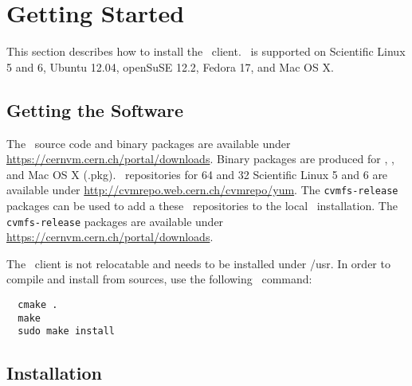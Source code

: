 \chapter{Getting Started}
\label{sct:start}

This section describes how to install the \cvmfs\ client.
\cvmfs\ is supported on Scientific Linux 5 and 6, Ubuntu 12.04, openSuSE 12.2, Fedora 17, and Mac OS X.

\section{Getting the Software}
The \cvmfs\ source code and binary packages are available under \url{https://cernvm.cern.ch/portal/downloads}.
Binary packages are produced for \rpm, \dpkg, and Mac OS X (.pkg).
\yum\ repositories for \SI{64}{\bit} and \SI{32}{\bit} Scientific Linux 5 and 6 are available under \url{http://cvmrepo.web.cern.ch/cvmrepo/yum}.
The \texttt{cvmfs-release} packages can be used to add a these \yum\ repositories to the local \yum\ installation.
The \texttt{cvmfs-release} packages are available under \url{https://cernvm.cern.ch/portal/downloads}.

The \cvmfs\ client is not relocatable and needs to be installed under /usr.
In order to compile and install from sources, use the following \cmake\ command:
\begin{verbatim}
  cmake .
  make
  sudo make install
\end{verbatim}

\section{Installation}
